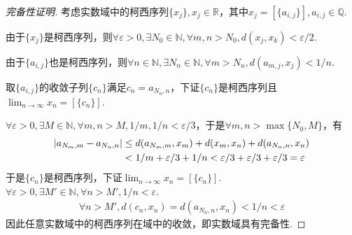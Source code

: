 \begin{proof}[完备性证明]
    考虑实数域中的柯西序列\(\{x_j\}, x_j \in \mathbb{R}\)，其中\(x_j=[\{a_{i,j}\}], a_{i,j} \in \mathbb{Q}\).

    由于\(\{x_j\}\)是柯西序列，则\(\forall \varepsilon>0, \exists N_0 \in \mathbb{N}, \forall m,n>N_0, d(x_j,x_k)<\varepsilon/2\).

    由于\(\{a_{i,j}\}\)也是柯西序列，则\(\forall n \in \mathbb{N}, \exists N_n \in \mathbb{N}, \forall m>N_n, d(a_{m,j},x_j)<1/n\).

    取\(\{a_{i,j}\}\)的收敛子列\(\{c_n\}\)满足\(c_n=a_{N_n,n}\)，下证\(\{c_n\}\)是柯西序列且\(\lim_{n \to \infty}x_n=[\{c_n\}]\).

    \(\forall \varepsilon>0, \exists M \in \mathbb{N}, \forall m,n>M, 1/m,1/n<\varepsilon/3\)，于是\(\forall m,n>\max\{N_0,M\}\)，有
    \begin{align*}
         \abs*{a_{N_m,m}-a_{N_n,n}} &\leq d(a_{N_m,m},x_m)+d(x_m,x_n)+d(a_{N_n,n},x_n) \\
        &<1/m+\varepsilon/3+1/n<\varepsilon/3+\varepsilon/3+\varepsilon/3=\varepsilon
    \end{align*}
    于是\(\{c_n\}\)是柯西序列，下证\(\lim_{n \to \infty}x_n=[\{c_n\}]\).\(\forall \varepsilon>0, \exists M' \in \mathbb{N}, \forall n>M', 1/n<\varepsilon\).
    \begin{align*}
        \forall n>M', d(c_n,x_n)=d(a_{N_n,n},x_n)<1/n<\varepsilon 
    \end{align*}
    {\kaishu 因此任意实数域中的柯西序列在域中的收敛，即实数域具有完备性.}
\end{proof}

